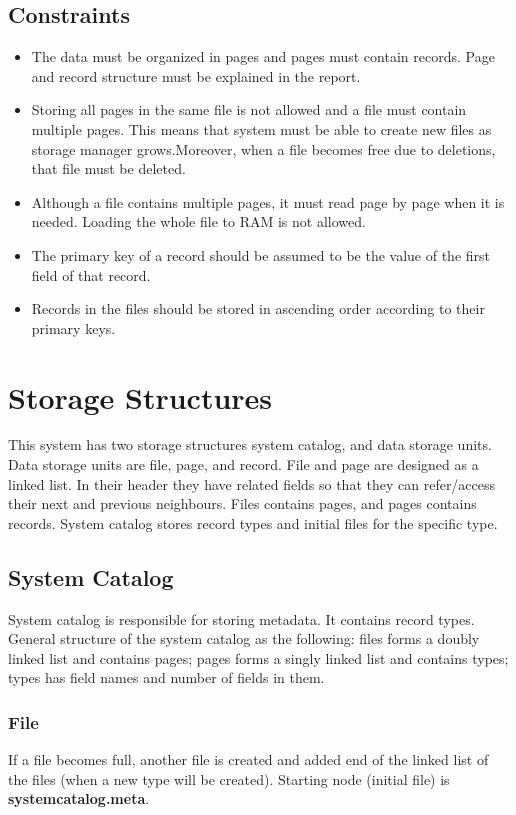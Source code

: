 \documentclass{article}
\begin{document}
\subsection{Constraints}
\begin{itemize}
    \item The data must be organized in pages and pages must contain records. Page and record structure must be explained in the report.
    \item Storing all pages in the same file is not allowed and a file must contain multiple pages. This means that system must be able to create new files as storage manager grows.Moreover, when a file becomes free due to deletions, that file must be deleted.
    \item Although a file contains multiple pages, it must read page by page when it is needed. Loading the whole file to RAM is not allowed.
    \item The primary key of a record should be assumed to be the value of the first field of that record.
    \item Records in the files should be stored in ascending order according to their primary keys.
\end{itemize}

\newpage
\section{Storage Structures}

This system has two storage structures system catalog, and data storage units. Data storage units are file, page, and record. File and page are designed as a linked list. In their header they have related fields so that they can refer/access their next and previous neighbours. Files contains pages, and pages contains records. System catalog stores record types and initial files for the specific type.

\subsection{System Catalog}
System catalog is responsible for storing metadata. It contains record types. General structure of the system catalog as the following: files forms a doubly linked list and contains pages; pages forms a singly linked list and contains types; types has field names and number of fields in them.

\subsubsection{File}
    If a file becomes full, another file is created and added end of the linked list of the files (when a new type will be created). Starting node (initial file) is \textbf{systemcatalog.meta}.
\end{document}
